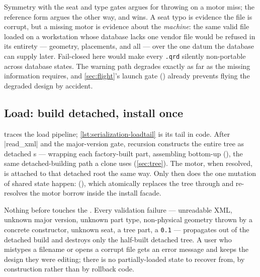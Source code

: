 \begin{rejected}
Symmetry with the seat and type gates argues for throwing on a motor miss; the reference
form argues the other way, and wins. A seat typo is evidence the file is corrupt, but a
missing motor is evidence about the \emph{machine}: the same valid file loaded on a
workstation whose database lacks one vendor file would be refused in its entirety ---
geometry, placements, and all --- over the one datum the database can supply later.
Fail-closed here would make every \texttt{.qrd} silently non-portable across database
states. The warning path degrades exactly as far as the missing information requires, and
\cref{sec:flight}'s launch gate () already prevents flying the
degraded design by accident.
\end{rejected}

\subsection{Load: build detached, install once}\label{sec:serialization-load}

 traces the load pipeline;
\cref{lst:serialization-loadtail} is its tail in code. After
\cppinline|read_xml| and the major-version gate,  recursion constructs
the entire tree as detached s ---  wrapping each
factory-built part,  assembling bottom-up
(), the same detached-building path a clone
uses (\cref{sec:tree}). The motor, when resolved, is attached to that detached root the
same way. Only then does the one mutation of shared state happen:
 (), which
atomically replaces the tree through  and re-resolves the
motor borrow inside the install facade.


\begin{keyinsight}
Nothing before  touches the . Every validation
failure --- unreadable XML, unknown major version, unknown part type, non-physical
geometry thrown by a concrete constructor, unknown seat, a  tree part, a
\texttt{0.1}  --- propagates out of the detached build and destroys only
the half-built detached tree. A user who mistypes a filename or opens a corrupt file gets
an error message and keeps the design they were editing; there is no partially-loaded
state to recover from, by construction rather than by rollback code.
\end{keyinsight}

